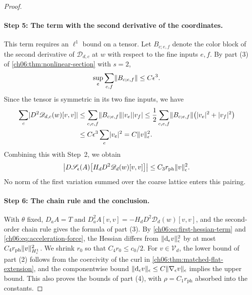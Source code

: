 \begin{proof}
\paragraph{Step 5: The term with the second derivative of the coordinates.}
This term requires an $\ell^1$ bound on a tensor. Let $B_{c;e,f}$ denote the color block of the second derivative of $\mathscr D_{d,c}$ at $w$ with respect to the fine inputs $e,f$. By part (3) of \cref{ch06:thm:nonlinear-section} with $s=2$,
\[
 \sup_e\sum_{c,f}\lVert B_{c;e,f}\rVert\le C\epsilon^3.
\]
Since the tensor is symmetric in its two fine inputs, we have
\begin{equation}\label{ch06:eq:acceleration-l1}
 \begin{split}
 \sum_c\lvert D^2\mathscr D_{d,c}(w)[v,v]\rvert&\le\sum_{c,e,f}\lVert B_{c;e,f}\rVert\lvert v_e\rvert\lvert v_f\rvert\le\frac12\sum_{c,e,f}\lVert B_{c;e,f}\rVert\bigl(\lvert v_e\rvert^2+\lvert v_f\rvert^2\bigr)\\
 &\le C\epsilon^3\sum_e\lvert v_e\rvert^2=C\lVert v\rVert_\epsilon^2.
 \end{split}
\end{equation}
Combining this with Step~2, we obtain
\begin{equation}\label{ch06:eq:acceleration-force}
 \bigl\lvert D\mathscr S_\epsilon(A)\bigl[H_dD^2\mathscr D_d(w)[v,v]\bigr]\bigr\rvert\le C_3r_{\mathrm{ph}}\lVert v\rVert_\epsilon^2.
\end{equation}
No norm of the first variation summed over the coarse lattice enters this pairing.

\paragraph{Step 6: The chain rule and the conclusion.}
With $\theta$ fixed, $D_aA=T$ and $D_a^2A[v,v]=-H_dD^2\mathscr D_d(w)[v,v]$, and the second-order chain rule gives the formula of part (3). By \eqref{ch06:eq:first-hessian-term} and \eqref{ch06:eq:acceleration-force}, the Hessian differs from $\lVert \mathrm d_\epsilon v\rVert_\epsilon^2$ by at most $C_4r_{\mathrm{ph}}\lVert v\rVert_{H^1_\epsilon}^2$. We shrink $r_0$ so that $C_4r_0\le c_0/2$. For $v\in\mathcal V_d$, the lower bound of part (2) follows from the coercivity of the curl in \cref{ch06:thm:matched-flat-extension}, and the componentwise bound $\lVert \mathrm d_\epsilon v\rVert_\epsilon\le C\lVert \nabla_\epsilon v\rVert_\epsilon$ implies the upper bound. This also proves the bounds of part (4), with $\rho=C_1r_{\mathrm{ph}}$ absorbed into the constants.


\end{proof}
